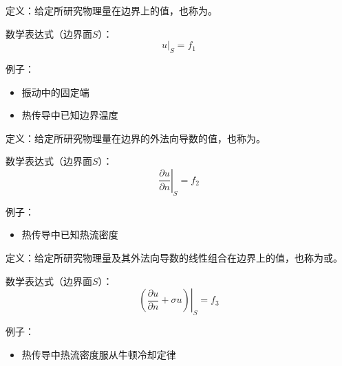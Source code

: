 \begin{myitemize}
	\item 定义：给定所研究物理量在边界上的值，也称为。\vspace*{-0.5em}
	\item 数学表达式（边界面$S$）：
	\begin{equation}
		\left. u\right|_S = f_1
	\end{equation}
\vspace*{-3em}
	\item 例子：\vspace*{-1em}
	\begin{itemize}
		\item 振动中的固定端\vspace*{-0.5em}
		\item 热传导中已知边界温度
	\end{itemize}
\end{myitemize}

\begin{myitemize}
	\item 定义：给定所研究物理量在边界的外法向导数的值，也称为。\vspace*{-0.5em}
	\item 数学表达式（边界面$S$）：
	\begin{equation}
		\left. \dfrac{\partial u}{\partial n} \right|_S = f_2
	\end{equation}
\vspace*{-2em}
	\item 例子：\vspace*{-1em}
\begin{itemize}
	\item 热传导中已知热流密度
\end{itemize}
\end{myitemize}

\begin{myitemize}
	\item 定义：给定所研究物理量及其外法向导数的线性组合在边界上的值，也称为或。\vspace*{-0.5em}
	\item 数学表达式（边界面$S$）：
	\begin{equation}
		\left. \left(\dfrac{\partial u}{\partial n} + \sigma u \right)\right|_S = f_3
	\end{equation}
\vspace*{-2em}
	\item 例子：\vspace*{-1em}
\begin{itemize}
	\item 热传导中热流密度服从牛顿冷却定律
\end{itemize}
\end{myitemize}
\vspace*{0.5em}

